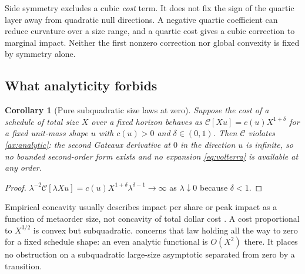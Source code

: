 \documentclass[11pt]{article}
\numberwithin{equation}{section}
\newtheorem{corollary}[theorem]{Corollary}
\theoremstyle{definition}
\theoremstyle{remark}
\theoremstyle{definition}
\begin{document}
Side symmetry excludes a cubic \emph{cost} term. It does not fix the sign
of the quartic layer away from quadratic null directions. A negative quartic
coefficient can reduce curvature over a size range, and a quartic cost gives a
cubic correction to marginal impact. Neither the first nonzero correction nor
global convexity is fixed by symmetry alone.

\subsection{What analyticity forbids}
\begin{corollary}[Pure subquadratic size laws at zero]\label{cor:nonanalytic}
Suppose the cost of a schedule of total size $X$ over a fixed horizon behaves
as $\mathcal C[Xu]=c(u)X^{1+\delta}$ for a fixed unit-mass shape $u$ with
$c(u)>0$ and $\delta\in(0,1)$. Then $\mathcal C$ violates
\cref{ax:analytic}: the second Gateaux derivative at $0$ in the direction $u$
is infinite, so no bounded second-order form exists and no expansion
\eqref{eq:volterra} is available at any order.
\end{corollary}
\begin{proof}
$\lambda^{-2}\mathcal C[\lambda Xu]=c(u)X^{1+\delta}\lambda^{\delta-1}\to\infty$
as $\lambda\downarrow0$ because $\delta<1$.
\end{proof}

Empirical concavity usually describes impact per share or peak impact as a
function of metaorder size, not concavity of total dollar cost
\citep{toth2011,zarinelli2015,bucci2018,bershova2013}. A cost proportional to
$X^{3/2}$ is convex but subquadratic.  concerns that
law holding all the way to zero for a fixed schedule shape: an even analytic
functional is $O(X^2)$ there. It places no obstruction on a subquadratic
large-size asymptotic separated from zero by a transition.
\end{document}
